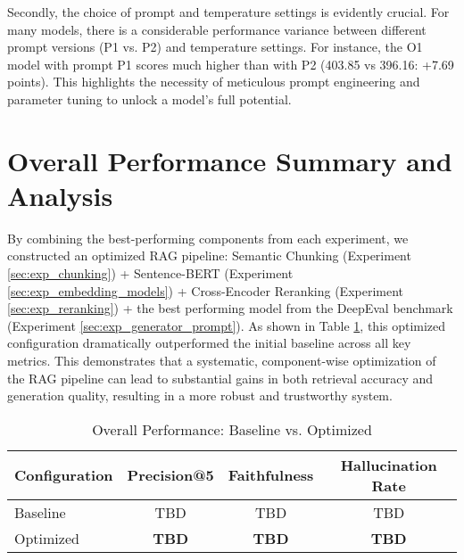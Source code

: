 Secondly, the choice of prompt and temperature settings is evidently crucial. For many models, there is a considerable performance variance between different prompt versions (P1 vs. P2) and temperature settings. For instance, the O1 model with prompt P1 scores much higher than with P2 (403.85 vs 396.16: +7.69 points). This highlights the necessity of meticulous prompt engineering and parameter tuning to unlock a model's full potential.


\section{Overall Performance Summary and Analysis}
\label{sec:overall_analysis}
By combining the best-performing components from each experiment, we constructed an optimized RAG pipeline: Semantic Chunking (Experiment \ref{sec:exp_chunking}) + Sentence-BERT (Experiment \ref{sec:exp_embedding_models}) + Cross-Encoder Reranking (Experiment \ref{sec:exp_reranking}) + the best performing model from the DeepEval benchmark (Experiment \ref{sec:exp_generator_prompt}). As shown in Table \ref{tab:overall_results}, this optimized configuration dramatically outperformed the initial baseline across all key metrics. This demonstrates that a systematic, component-wise optimization of the RAG pipeline can lead to substantial gains in both retrieval accuracy and generation quality, resulting in a more robust and trustworthy system.

\begin{table}[!htbp]
\centering
\caption{Overall Performance: Baseline vs. Optimized}
\label{tab:overall_results}
\begin{tabular}{|l|c|c|c|}
\hline
\textbf{Configuration} & \textbf{Precision@5} & \textbf{Faithfulness} & \textbf{Hallucination Rate} \\
\hline
Baseline & TBD & TBD & TBD \\
Optimized & \textbf{TBD} & \textbf{TBD} & \textbf{TBD} \\
\hline
\end{tabular}
\end{table}